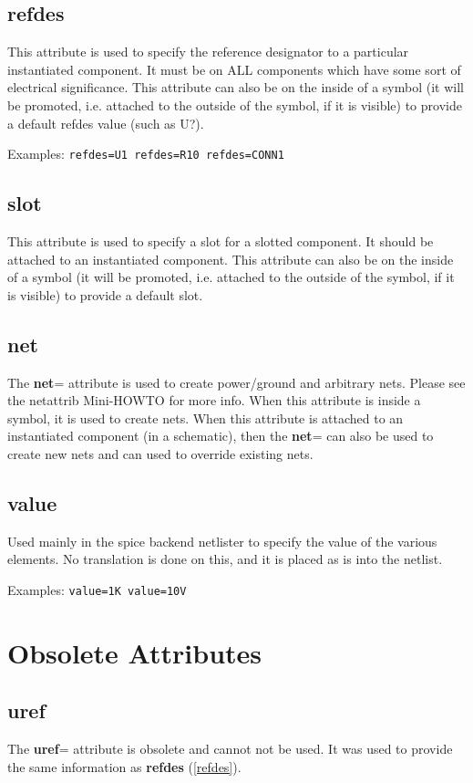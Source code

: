 \documentclass{article}
\begin{document}
\subsection{{\bf refdes}\label{refdes}}
This attribute is used to specify the reference designator to a particular
instantiated component.  It must be on ALL components which have some
sort of electrical significance.  This attribute can also be on the
inside of a symbol (it will be promoted, i.e. attached to the outside of
the symbol, if it is visible) to provide a default refdes value (such as
U?).

Examples: \texttt{refdes=U1 refdes=R10 refdes=CONN1}

\subsection{{\bf slot}\label{slot}}
This attribute is used to specify a slot for a slotted component.
It should be attached to an instantiated component.  This attribute can
also be on the inside of a symbol (it will be promoted, i.e. attached
to the outside of the symbol, if it is visible) to provide a default
slot.

\subsection{{\bf net}\label{net}}
The {\bf net}= attribute is used to create power/ground and arbitrary nets.
Please see the netattrib Mini-HOWTO for more info.  When this attribute
is inside a symbol, it is used to create nets.  When this attribute is
attached to an instantiated component (in a schematic), then the
{\bf net}= can also be used to create new nets and can used to override
existing nets.

\subsection{{\bf value}\label{value}}
Used mainly in the spice backend netlister to specify the value of the
various elements.  No translation is done on this, and it is placed as
is into the netlist.

Examples: \texttt{value=1K value=10V}


\section{Obsolete Attributes}

\subsection{{\bf uref}\label{uref}}
The {\bf uref}= attribute is obsolete and cannot not be used.  It was used
to provide the same information as {\bf refdes} (\ref{refdes}).
\end{document}
